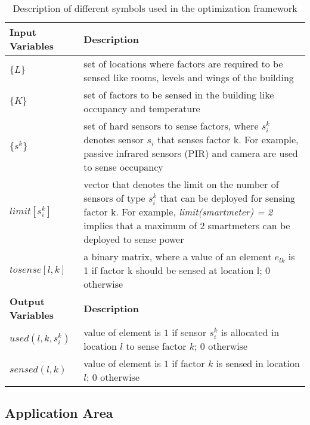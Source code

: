 \documentclass[]{interact}
\theoremstyle{plain}%
\theoremstyle{definition}
\theoremstyle{remark}
\begin{document}
\begin{table}[h]
\caption{Description of different symbols used in the optimization framework}
	\centering
	\begin{tabular}{p{}  p{}}
		\toprule
		\textbf{Input Variables} & \textbf{Description}
		\\ \midrule
		$\{L\}$                           & set of locations where factors are required to be sensed like rooms, levels and wings of the building
		\\ \hline
		$ \{K\} $                         & set of factors to be sensed in the building like occupancy and temperature
    \\ \hline
    $\{s^k\}$ & set of hard sensors to sense factors, where $s_i^k$ denotes sensor $s_i$ that senses factor k. For example, passive infrared sensors (PIR) and camera are used to sense occupancy
    \\ \hline
    $limit[s_i^k]$ & vector that denotes the limit on the number of sensors of type $s_i^k$ that can be deployed for sensing factor k. For example, \textit{limit(smartmeter) = 2} implies that a maximum of 2 smartmeters can be deployed to sense power
    \\ \hline
    $tosense[l,k]$ & a binary matrix, where 
     a value of an element $e_{lk}$ is 1 if factor k should be sensed at location l; 0 otherwise
    \\ \midrule
    \textbf{Output Variables} & \textbf{Description} 
    \\ \midrule
    $used(l,k,s_i^k)$  &  value of element is $1$ if sensor $s_i^k$ is allocated in location $l$ to sense factor $k$; $0$ otherwise 
    \\ \hline
    $sensed(l,k)$    & value of element is $1$ if factor $k$ is sensed in location $l$; $0$ otherwise
    \\ \bottomrule
	\end{tabular}
	\label{tab:var}
\end{table}

\subsection{Application Area}
\end{document}
